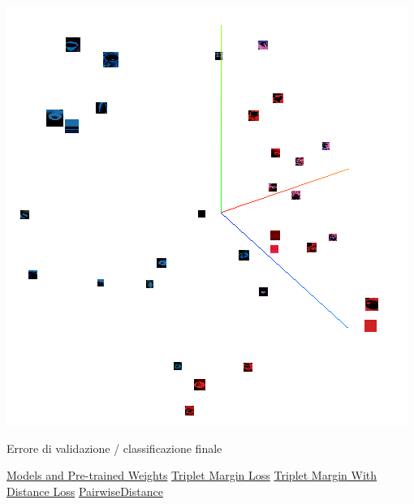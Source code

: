 \documentclass[11pt]{article}
\begin{document}
\begin{center}
    \begin{minipage}{0.48\linewidth}
    \includegraphics[width=\linewidth]{tensorboard_2.png}
    \end{minipage}
\end{center}

Errore di validazione / classificazione finale


\pagebreak

\begin{thebibliography}{4}

 \href{https://pytorch.org/vision/stable/models.html}{Models and Pre-trained Weights}
 \href{
    https://pytorch.org/docs/stable/generated/torch.nn.TripletMarginLoss.html
}{Triplet Margin Loss}
 \href{
    https://pytorch.org/docs/stable/generated/torch.nn.TripletMarginWithDistanceLoss.html#torch.nn.TripletMarginWithDistanceLoss
}{Triplet Margin With Distance Loss}
 \href{
    https://pytorch.org/docs/stable/generated/torch.nn.PairwiseDistance.html
}{PairwiseDistance}



\end{thebibliography}


\pagebreak
\end{document}
